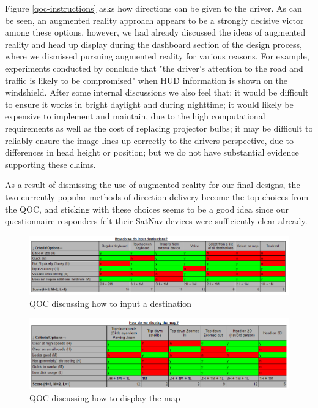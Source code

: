 \documentclass{article}
\begin{document}
Figure \ref{qoc-instructions} asks how directions can be given to the driver. As can be seen, an augmented reality approach appears to be a strongly decisive victor among these options, however, we had already discussed the ideas of augmented reality and head up display during the dashboard section of the design process, where we dismissed pursuing augmented reality for various reasons. For example, experiments conducted by \cite{RefWorks:3} 
conclude that "the driver's attention to the road and traffic is likely to be compromised" when HUD information is shown on the windshield. After some internal discussions we also feel that: it would be difficult to ensure it works in bright daylight and during nighttime; it would likely be expensive to implement and maintain, due to the high computational requirements as well as the cost of replacing projector bulbs; it may be difficult to reliably ensure the image lines up correctly to the drivers perspective, due to differences in head height or position; but we do not have substantial evidence supporting these claims.

As a result of dismissing the use of augmented reality for our final designs, the two currently popular methods of direction delivery become the top choices from the QOC, and sticking with these choices seems to be a good idea since our questionnaire responders felt their SatNav devices were sufficiently clear already.

\begin{figure}[H]
  \centering
  \includegraphics[scale=0.5]{qoc-nav-input}
  \caption{QOC discussing how to input a destination}\label{qoc-input}
\end{figure}

\begin{figure}[H]
  \centering
  \includegraphics[scale=0.5]{qoc-nav-map}
  \caption{QOC discussing how to display the map}\label{qoc-map}
\end{figure}
\end{document}
